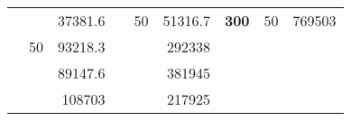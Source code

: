 \begin{table}[H]
\begin{tabular}{|ccrccrccc}
\rowcolor[HTML]{DDFDFF} 
\multicolumn{1}{|c|}{\cellcolor[HTML]{FFFFC7}}                                & \multicolumn{1}{c|}{\cellcolor[HTML]{DDFDFF}}                      & \multicolumn{1}{r|}{\cellcolor[HTML]{DAE8FC}37381.6}   & \multicolumn{1}{c|}{\cellcolor[HTML]{FFFFC7}}                                & \multicolumn{1}{c|}{\multirow{-10}{*}{\cellcolor[HTML]{DDFDFF}50}}  & \multicolumn{1}{r|}{\cellcolor[HTML]{DDFDFF}51316.7}   & \multicolumn{1}{c|}{\multirow{-19}{*}{\cellcolor[HTML]{FFFFC7}\textbf{300}}} & \multicolumn{1}{c|}{\multirow{-10}{*}{\cellcolor[HTML]{DDFDFF}50}} & \multicolumn{1}{r|}{\cellcolor[HTML]{DDFDFF}769503}    \\ \cline{3-3} \cline{5-9} 
\multicolumn{1}{|c|}{\cellcolor[HTML]{FFFFC7}}                                & \multicolumn{1}{c|}{\multirow{-10}{*}{\cellcolor[HTML]{DDFDFF}50}} & \multicolumn{1}{r|}{\cellcolor[HTML]{DDFDFF}93218.3}   & \multicolumn{1}{c|}{\cellcolor[HTML]{FFFFC7}}                                & \multicolumn{1}{c|}{\cellcolor[HTML]{DAE8FC}}                       & \multicolumn{1}{r|}{\cellcolor[HTML]{DAE8FC}292338}    &                                                                              &                                                                    &                                                        \\ \cline{2-3} \cline{6-6}
\multicolumn{1}{|c|}{\cellcolor[HTML]{FFFFC7}}                                & \multicolumn{1}{c|}{\cellcolor[HTML]{DAE8FC}}                      & \multicolumn{1}{r|}{\cellcolor[HTML]{DAE8FC}89147.6}   & \multicolumn{1}{c|}{\cellcolor[HTML]{FFFFC7}}                                & \multicolumn{1}{c|}{\cellcolor[HTML]{DAE8FC}}                       & \multicolumn{1}{r|}{\cellcolor[HTML]{DDFDFF}381945}    &                                                                              &                                                                    &                                                        \\ \cline{3-3} \cline{6-6}
\multicolumn{1}{|c|}{\cellcolor[HTML]{FFFFC7}}                                & \multicolumn{1}{c|}{\cellcolor[HTML]{DAE8FC}}                      & \multicolumn{1}{r|}{\cellcolor[HTML]{DDFDFF}108703}    & \multicolumn{1}{c|}{\cellcolor[HTML]{FFFFC7}}                                & \multicolumn{1}{c|}{\cellcolor[HTML]{DAE8FC}}                       & \multicolumn{1}{r|}{\cellcolor[HTML]{DAE8FC}217925}    &                                                                              &                                                                    &                                                        \\ \cline{3-3} \cline{6-6}

\end{tabular}
\end{table}
